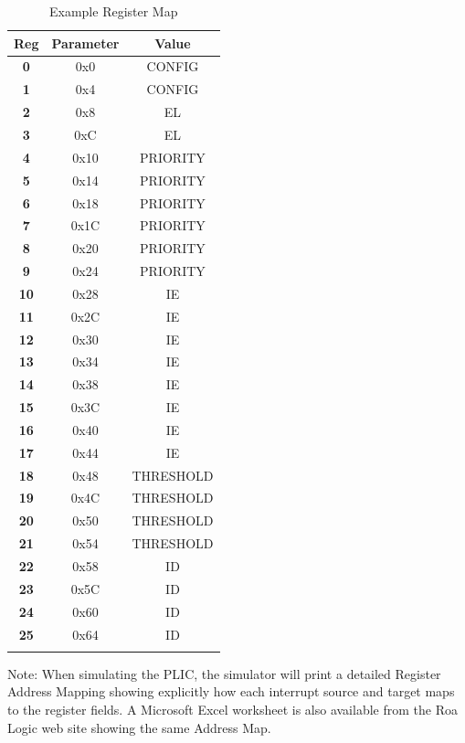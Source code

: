 \begin{longtable}[c]{ccc}	
		\toprule 
		\textbf{Reg} & \textbf{Parameter} & \textbf{Value}\\
		\midrule 
		\endhead
		\textbf{0} & 0x0 & CONFIG\\
		\textbf{1} & 0x4 & CONFIG\\
		\textbf{2} & 0x8 & EL\\
		\textbf{3} & 0xC & EL\\
		\textbf{4} & 0x10 & PRIORITY\\
		\textbf{5} & 0x14 & PRIORITY\\
		\textbf{6} & 0x18 & PRIORITY\\
		\textbf{7} & 0x1C & PRIORITY\\
		\textbf{8} & 0x20 & PRIORITY\\
		\textbf{9} & 0x24 & PRIORITY\\
		\textbf{10} & 0x28 & IE\\
		\textbf{11} & 0x2C & IE\\
		\textbf{12} & 0x30 & IE\\
		\textbf{13} & 0x34 & IE\\
		\textbf{14} & 0x38 & IE\\
		\textbf{15} & 0x3C & IE\\
		\textbf{16} & 0x40 & IE\\
		\textbf{17} & 0x44 & IE\\
		\textbf{18} & 0x48 & THRESHOLD\\
		\textbf{19} & 0x4C & THRESHOLD\\
		\textbf{20} & 0x50 & THRESHOLD\\
		\textbf{21} & 0x54 & THRESHOLD\\
		\textbf{22} & 0x58 & ID\\
		\textbf{23} & 0x5C & ID\\
		\textbf{24} & 0x60 & ID\\
		\textbf{25} & 0x64 & ID\\
		\bottomrule 	
	\caption{Example Register Map}
	\label{tab:REGMAPRES}
\end{longtable}

Note: When simulating the PLIC, the simulator will print a detailed Register Address
Mapping showing explicitly how each interrupt source and target maps to the register fields. A Microsoft Excel worksheet is also available from the Roa Logic web site showing the same Address Map.

